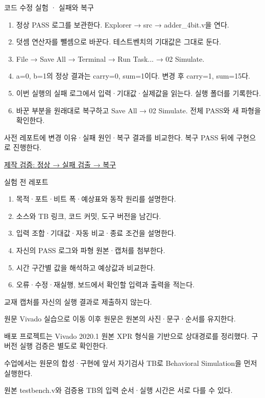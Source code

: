 \begin{frame}{코드 수정 실험 · 실패와 복구}\relax
\small
\begin{enumerate}\setlength{\itemsep}{0.22cm}
\item 정상 PASS 로그를 보관한다. Explorer → src → adder\_4bit.v을 연다.
\item 덧셈 연산자를 뺄셈으로 바꾼다. 테스트벤치의 기대값은 그대로 둔다.
\item File → Save All → Terminal → Run Task... → 02 Simulate.
\item a=0, b=1의 정상 결과는 carry=0, sum=1이다. 변경 후 carry=1, sum=15다.
\item 이번 실행의 실패 로그에서 입력·기대값·실제값을 읽는다. 실행 폴더를 기록한다.
\item 바꾼 부분을 원래대로 복구하고 Save All → 02 Simulate. 전체 PASS와 새 파형을 확인한다.
\end{enumerate}
사전 레포트에 변경 이유·실패 원인·복구 결과를 비교한다. 복구 PASS 뒤에 구현으로 진행한다.\par\href{https://github.com/Glaysia/ece2_26_2_2/blob/daily/0910/example/fpga_projects_hdl/LAB1/docs/student-modification-validation.json}{제작 검증: 정상 → 실패 검출 → 복구}
\end{frame}

\begin{frame}{실험 전 레포트}\relax
\small
\begin{enumerate}\setlength{\itemsep}{0.22cm}
\item 목적·포트·비트 폭·예상표와 동작 원리를 설명한다.
\item 소스와 TB 링크, 코드 커밋, 도구 버전을 남긴다.
\item 입력 조합·기대값·자동 비교·종료 조건을 설명한다.
\item 자신의 PASS 로그와 파형 원본·캡처를 첨부한다.
\item 시간 구간별 값을 해석하고 예상값과 비교한다.
\item 오류·수정·재실행, 보드에서 확인할 입력과 출력을 적는다.
\end{enumerate}
교재 캡처를 자신의 실행 결과로 제출하지 않는다.\par
\end{frame}

\begin{frame}[label=legacy-03-vivado]{원문 Vivado 실습으로 이동}\relax
\small
이후 원문은 원본의 사진·문구·순서를 유지한다.\par\vspace{0.22cm}배포 프로젝트는 Vivado 2020.1 원본 XPR 형식을 기반으로 상대경로를 정리했다. 구버전 실행 검증은 별도로 확인한다.\par\vspace{0.22cm}수업에서는 원문의 합성·구현에 앞서 자기검사 TB로 Behavioral Simulation을 먼저 실행한다.\par\vspace{0.22cm}원본 testbench.v와 검증용 TB의 입력 순서·실행 시간은 서로 다를 수 있다.\par
\end{frame}

